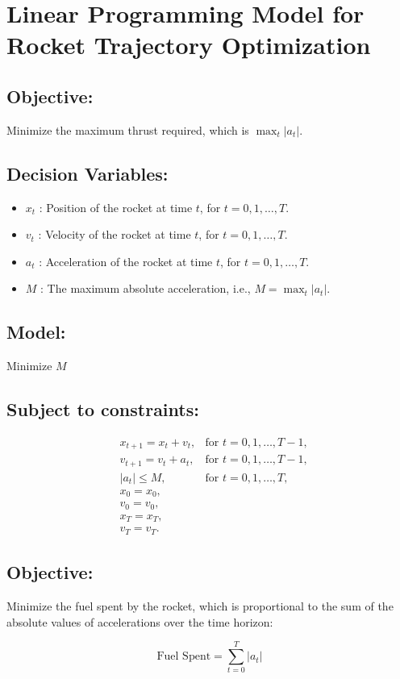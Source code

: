 \documentclass{article}
\begin{document}
\section*{Linear Programming Model for Rocket Trajectory Optimization}

\subsection*{Objective:}
Minimize the maximum thrust required, which is \(\max_t |a_t|\).

\subsection*{Decision Variables:}
\begin{itemize}
    \item \(x_t\) : Position of the rocket at time \(t\), for \(t = 0, 1, \ldots, T\).
    \item \(v_t\) : Velocity of the rocket at time \(t\), for \(t = 0, 1, \ldots, T\).
    \item \(a_t\) : Acceleration of the rocket at time \(t\), for \(t = 0, 1, \ldots, T\).
    \item \(M\) : The maximum absolute acceleration, i.e., \(M = \max_t |a_t|\).
\end{itemize}

\subsection*{Model:}

Minimize \( M \)

\subsection*{Subject to constraints:}

\begin{align*}
    & x_{t+1} = x_t + v_t, & \text{for } t = 0, 1, \ldots, T-1, \\
    & v_{t+1} = v_t + a_t, & \text{for } t = 0, 1, \ldots, T-1, \\
    & |a_t| \leq M, & \text{for } t = 0, 1, \ldots, T, \\
    & x_0 = x_0, \\
    & v_0 = v_0, \\
    & x_T = x_T, \\
    & v_T = v_T.
\end{align*}

\subsection*{Objective:}
Minimize the fuel spent by the rocket, which is proportional to the sum of the absolute values of accelerations over the time horizon:

\[
\text{Fuel Spent} = \sum_{t=0}^{T} |a_t|
\]
\end{document}
